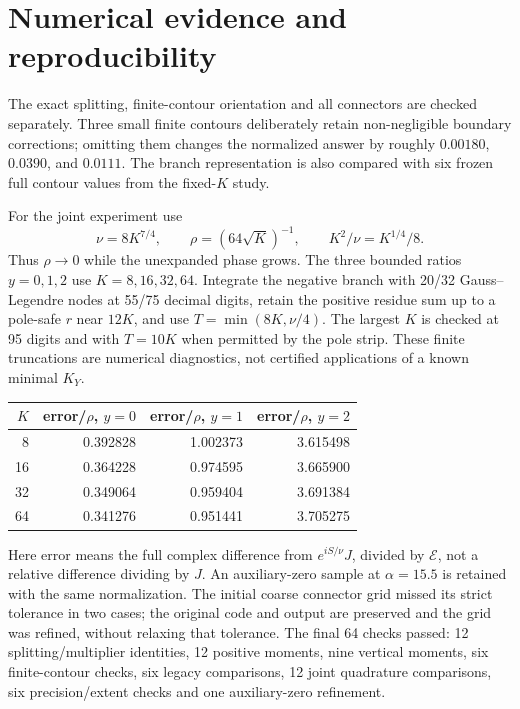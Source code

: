 \documentclass[11pt,a4paper]{article}
\newcommand{\E}{\mathcal E}
\begin{document}
\section{Numerical evidence and reproducibility}
The exact splitting, finite-contour orientation and all connectors
are checked separately. Three small finite contours deliberately
retain non-negligible boundary corrections; omitting them changes
the normalized answer by roughly \(0.00180\), \(0.0390\), and \(0.0111\).
The branch representation is also compared with six frozen full
contour values from the fixed-\(K\) study.

For the joint experiment use
\[
 \nu=8K^{7/4},\qquad \rho=(64\sqrt K)^{-1},\qquad
 K^2/\nu=K^{1/4}/8.
\]
Thus \(\rho\to0\) while the unexpanded phase grows.
The three bounded ratios \(y=0,1,2\) use \(K=8,16,32,64\).
Integrate the negative branch with 20/32 Gauss--Legendre nodes
at 55/75 decimal digits, retain the positive residue sum up to
a pole-safe \(r\) near \(12K\), and use \(T=\min(8K,\nu/4)\).
The largest \(K\) is checked at 95 digits and with \(T=10K\)
when permitted by the pole strip.
These finite truncations are numerical diagnostics, not certified
applications of a known minimal \(K_Y\).

\begin{center}
\begin{tabular}{rrrr}
\toprule
\(K\)&error/\(\rho\), \(y=0\)&error/\(\rho\), \(y=1\)&error/\(\rho\), \(y=2\)\\
\midrule
8&0.392828&1.002373&3.615498\\
16&0.364228&0.974595&3.665900\\
32&0.349064&0.959404&3.691384\\
64&0.341276&0.951441&3.705275\\
\bottomrule
\end{tabular}
\end{center}
Here error means the full complex difference from
\(e^{iS/\nu}J\), divided by \(\E\), not a relative difference
dividing by \(J\). An auxiliary-zero sample at \(\alpha=15.5\)
is retained with the same normalization.
The initial coarse connector grid missed its strict tolerance in
two cases; the original code and output are preserved and the grid
was refined, without relaxing that tolerance.
The final 64 checks passed: 12 splitting/multiplier identities,
12 positive moments, nine vertical moments, six finite-contour
checks, six legacy comparisons, 12 joint quadrature comparisons,
six precision/extent checks and one auxiliary-zero refinement.
\end{document}
